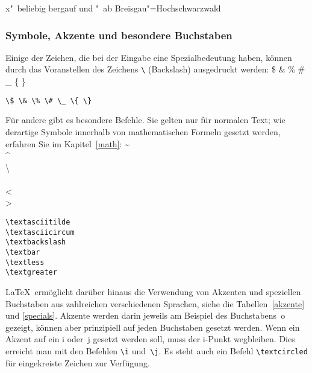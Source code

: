 
\begin{LTXexample}
x"~beliebig
bergauf und "~ab
Breisgau"=Hochschwarzwald
\end{LTXexample}


\subsubsection{Symbole, Akzente und besondere Buchstaben}\label{symbole}

Einige der Zeichen, die bei der Eingabe eine Spezialbedeutung haben,
können durch das Voranstellen des
Zeichens \lstinline|\| (Backslash) ausgedruckt werden:
\exa
\$ \& \% \# \_ \{ \}
\exb
\begin{verbatim}
\$ \& \% \# \_ \{ \}
\end{verbatim}
\exc
Für andere gibt es besondere Befehle.  Sie gelten nur für normalen
Text; wie derartige Symbole innerhalb von mathematischen
Formeln gesetzt werden, erfahren Sie im Kapitel~\ref{math}:
\exa
\textasciitilde \\
\textasciicircum \\
\textbackslash \\
\textbar \\ 
\textless\\
\textgreater
\exb
\begin{verbatim}
\textasciitilde
\textasciicircum
\textbackslash 
\textbar  
\textless  
\textgreater
\end{verbatim}
\exc

\LaTeX\ ermöglicht darüber hinaus die Verwendung von Akzenten 
und speziellen Buchstaben aus zahlreichen verschiedenen Sprachen, 
siehe die Tabellen~\ref{akzente}  und \ref{specials}.
Akzente werden darin jeweils am Beispiel
des Buchstabens~o gezeigt, können aber prinzipiell auf jeden
Buchstaben gesetzt werden.
Wenn ein Akzent auf ein i oder~j gesetzt werden soll, muss der
\mbox{i-Punkt} wegbleiben. Dies erreicht man mit den Befehlen
\lstinline|\i| und~\lstinline|\j|.
Es steht auch ein Befehl \lstinline|\textcircled| für 
eingekreiste Zeichen zur Verfügung.


